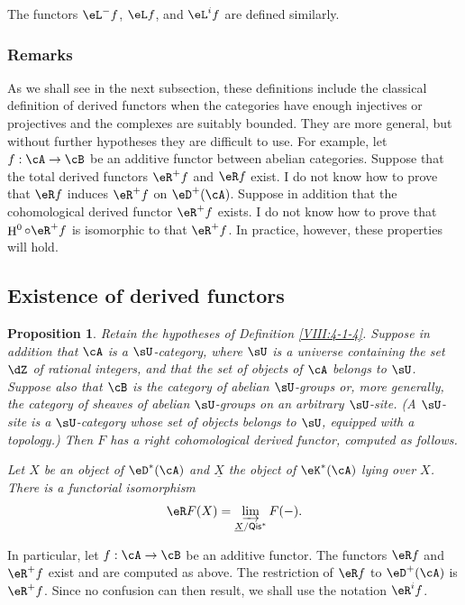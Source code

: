 \documentclass[12pt,oneside,english]{smfbook}
\DeclareMathOperator{\h}{H}
\newtheorem{proposition}[subsubsection]{Proposition}
\begin{document}
The functors $\eL^-f$, $\eL f$, and $\eL^if$ are defined similarly.

\subsubsection{Remarks}\label{VIII:4-1-6}

As we shall see in the next subsection, these definitions include the classical definition of derived functors when the categories have enough injectives or projectives and the complexes are suitably bounded. They are more general, but without further hypotheses they are difficult to use. For example, let $f:\cA\to\cB$ be an additive functor between abelian categories. Suppose that the total derived functors $\eR^+f$ and $\eR f$ exist. I do not know how to prove that $\eR f$ induces $\eR^+f$ on $\eD^+(\cA)$. Suppose in addition that the cohomological derived functor $\eR^+f$ exists. I do not know how to prove that $\h^0\circ\eR^+f$ is isomorphic to that $\eR^+f$. In practice, however, these properties will hold.

\subsection{Existence of derived functors}\label{VIII:4-2}

\begin{proposition}\label{VIII:4-2-1}
Retain the hypotheses of Definition \ref{VIII:4-1-4}. Suppose in addition that $\cA$ is a $\sU$-category, where $\sU$ is a universe containing the set $\dZ$ of rational integers, and that the set of objects of $\cA$ belongs to $\sU$. Suppose also that $\cB$ is the category of abelian $\sU$-groups or, more generally, the category of sheaves of abelian $\sU$-groups on an arbitrary $\sU$-site. (A $\sU$-site is a $\sU$-category whose set of objects belongs to $\sU$, equipped with a topology.) Then $F$ has a right cohomological derived functor, computed as follows.

Let $X$ be an object of $\eD^\ast(\cA)$ and $\underline X$ the object of $\eK^\ast(\cA)$ lying over $X$. There is a functorial isomorphism
\[
  \eR F(X) = \varinjlim_{\underline X/\mathsf{Qis}^\ast} F(-) \text{.}
\]
\end{proposition}

In particular, let $f:\cA\to\cB$ be an additive functor. The functors $\eR f$ and $\eR^+f$ exist and are computed as above. The restriction of $\eR f$ to $\eD^+(\cA)$ is $\eR^+f$. Since no confusion can then result, we shall use the notation $\eR^if$.
\end{document}
